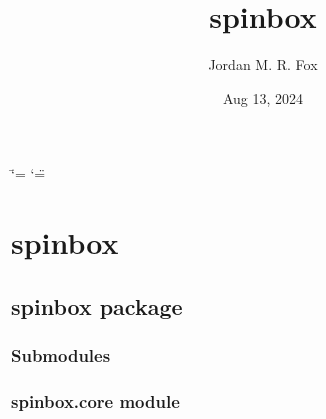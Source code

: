 \documentclass[letterpaper,10pt,english]{sphinxmanual}
\title{spinbox}
\date{Aug 13, 2024}
\author{Jordan M.\@{} R.\@{} Fox}
\begin{document}
\ifdefined\shorthandoff
  \ifnum\catcode`\=\string=\active\shorthandoff{=}\fi
  \ifnum\catcode`\"=\active{}\fi
\fi

\pagestyle{empty}
\sphinxmaketitle
\pagestyle{plain}
\sphinxtableofcontents
\pagestyle{normal}
\label{\detokenize{index::doc}}


\sphinxstepscope


\chapter{spinbox}
\label{\detokenize{modules:spinbox}}\label{\detokenize{modules::doc}}
\sphinxstepscope


\section{spinbox package}
\label{\detokenize{spinbox:spinbox-package}}\label{\detokenize{spinbox::doc}}

\subsection{Submodules}
\label{\detokenize{spinbox:submodules}}

\subsection{spinbox.core module}
\label{\detokenize{spinbox:module-spinbox.core}}\label{\detokenize{spinbox:spinbox-core-module}}
\end{document}
